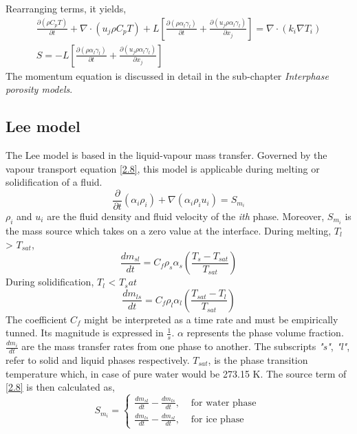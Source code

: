 Rearranging terms, it yields,
\begin{equation}
	\begin{aligned}
		\frac{\partial (\rho C_{p} T)}{\partial t}+ \nabla \cdot\left(u_{j}\rho C_{p} T\right)+L\left[\frac{\partial (\rho \alpha_{l}\gamma_{l})}{\partial t}+ \frac{\partial (u_{j}\rho \alpha_{l}\gamma_{l})}{\partial x_{j}}\right]=\nabla \cdot\left(k_{i} \nabla T_{i}\right)  \\
		S = -L\left[\frac{\partial (\rho \alpha_{l}\gamma_{l})}{\partial t}+ \frac{\partial (u_{j}\rho \alpha_{l}\gamma_{l})}{\partial x_{j}}\right]
	\end{aligned}
	\label{2.8}
\end{equation}
The momentum equation is discussed in detail in the sub-chapter \textit{Interphase porosity models}.

\subsection{Lee model}
The Lee model is based in the liquid-vapour mass transfer. Governed by the vapour transport equation \ref{2.8}, this model is applicable during melting or solidification of a fluid.
\begin{equation}
	\frac{\partial}{\partial t}\left(\alpha_{i} \rho_{i}\right)+\nabla\left(\alpha_{i} \rho_{i} {u}_{i}\right)=S_{m _i}
	\label{2.9}
\end{equation}
\textit{$\rho_i$} and \textbf{$u_i$} are the fluid density and fluid velocity of the \textit{i{th}} phase. Moreover, $S_{m_i}$ is the mass source which takes on a zero value at the interface.
\newline
During melting, $T_l$ > $T_{sat}$,
\begin{equation}
	\frac{d m_{s l}}{d t}=C_{f} \rho_{s} \alpha_{s}\left(\frac{T_{s}-T_{s a t}}{T_{s a t}}\right)
	\label{2.10}
\end{equation}
During solidification, $T_l$ < $T_sat$
\begin{equation}
	\label{2.11}
	\frac{d m_{l s}}{d t}=C_{f} \rho_{l} \alpha_{l}\left(\frac{T_{s a t}-T_{l}}{T_{s a t}}\right)
\end{equation}
The coefficient $C_f$ might be interpreted as a time rate and must be empirically tunned. Its magnitude is expressed in $\frac{1}{s}$. $\alpha$ represents the phase volume fraction. $\frac{d m_{i}}{d t}$ are the mass transfer rates from one phase to another. The subscripts \textit{"s"}, \textit{"l"}, refer to solid and liquid phases respectively. \textit{$T_{sat}$}, is the phase transition temperature which, in case of pure water would be 273.15 K.
The source term of \ref{2.8} is then calculated as,
\begin{equation}
	\label{2.12}
	S_{m_{i}}=\left\{\begin{array}{lr}
	\frac{d m_{s l}}{d t}-\frac{d m_{l s}}{d t}, & \text { for water phase } \\
	\frac{d m_{l s}}{d t}-\frac{d m_{s l}}{d t}, & \text { for ice phase }
	\end{array}\right.
\end{equation}  
